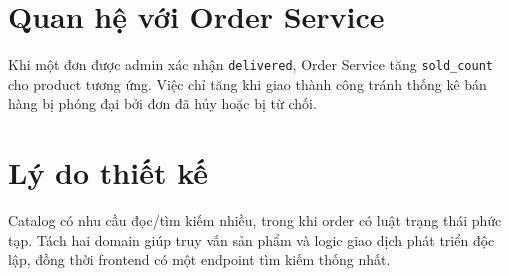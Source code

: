 \documentclass[12pt]{article}
\begin{document}
\section{Quan hệ với Order Service}
Khi một đơn được admin xác nhận \texttt{delivered}, Order Service tăng \texttt{sold\_count} cho product tương ứng. Việc chỉ tăng khi giao thành công tránh thống kê bán hàng bị phóng đại bởi đơn đã hủy hoặc bị từ chối.

\section{Lý do thiết kế}
Catalog có nhu cầu đọc/tìm kiếm nhiều, trong khi order có luật trạng thái phức tạp. Tách hai domain giúp truy vấn sản phẩm và logic giao dịch phát triển độc lập, đồng thời frontend có một endpoint tìm kiếm thống nhất.
\end{document}
